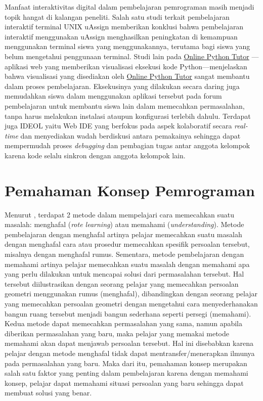 Manfaat interaktivitas digital dalam pembelajaran pemrograman masih menjadi topik hangat di kalangan peneliti. Salah satu studi terkait pembelajaran interaktif terminal UNIX uAssign \parencite{bailey2019uassign} memberikan konklusi bahwa pembelajaran interaktif menggunakan uAssign menghasilkan peningkatan di kemampuan menggunakan terminal siswa yang menggunakannya, terutama bagi siswa yang belum mengetahui  penggunaan terminal. Studi lain pada \href{https://pythontutor.com}{Online Python Tutor} \parencite{guo2013pythontutor}---aplikasi web yang memberikan visualisasi eksekusi kode Python---menjelaskan bahwa visualisasi yang disediakan oleh \href{https://pythontutor.com}{Online Python Tutor} sangat membantu dalam proses pembelajaran. Eksekusinya yang dilakukan secara daring juga memudahkan siswa dalam menggunakan aplikasi tersebut pada forum pembelajaran untuk membantu siswa lain dalam memecahkan permasalahan, tanpa harus melakukan instalasi ataupun konfigurasi terlebih dahulu. Terdapat juga IDEOL \parencite{tran2013interactive} yaitu Web IDE yang berfokus pada aspek kolaboratif secara \textit{real-time} dan menyediakan wadah berdiskusi antara pemakainya sehingga dapat mempermudah proses \textit{debugging} dan pembagian tugas antar anggota kelompok karena kode selalu sinkron dengan anggota kelompok lain.

\section{Pemahaman Konsep Pemrograman}
Menurut \textcite{mayer1981psychology}, terdapat 2 metode dalam mempelajari cara memecahkan suatu masalah: menghafal (\textit{rote learning}) atau memahami (\textit{understanding}). Metode pembelajaran dengan menghafal artinya pelajar memecahkan suatu masalah dengan menghafal cara atau prosedur memecahkan spesifik persoalan tersebut, misalnya dengan menghafal rumus. Sementara, metode pembelajaran dengan memahami artinya pelajar memecahkan suatu masalah dengan memahami apa yang perlu dilakukan untuk mencapai solusi dari permasalahan tersebut. Hal tersebut diilustrasikan dengan seorang pelajar yang memecahkan persoalan geometri menggunakan rumus (menghafal), dibandingkan dengan seorang pelajar yang memecahkan persoalan geometri dengan mengetahui cara menyederhanakan bangun ruang tersebut menjadi bangun sederhana seperti persegi (memahami). Kedua metode dapat memecahkan permasalahan yang sama, namun apabila diberikan permasalahan yang baru, maka pelajar yang memakai metode memahami akan dapat menjawab persoalan tersebut. Hal ini disebabkan karena pelajar dengan metode menghafal tidak dapat mentransfer/menerapkan ilmunya pada permasalahan yang baru. Maka dari itu, pemahaman konsep merupakan salah satu faktor yang penting dalam pembelajaran karena dengan memahami konsep, pelajar dapat memahami situasi persoalan yang baru sehingga dapat membuat solusi yang benar.

